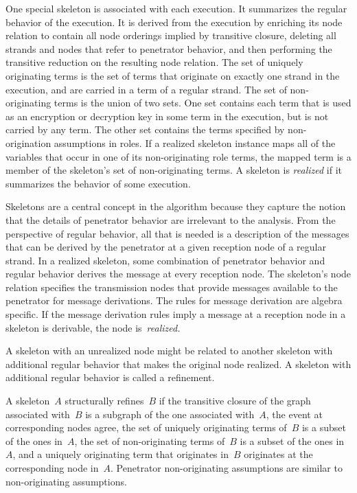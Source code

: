 \documentclass[12pt]{article}
\begin{document}
One special skeleton is associated with each execution.  It summarizes
the regular behavior of the execution.  It is derived from the
execution by enriching its node relation to contain all node orderings
implied by transitive closure, deleting all strands and nodes that
refer to penetrator behavior, and then performing the transitive
reduction on the resulting node relation.  The set of uniquely
originating terms is the set of terms that originate on exactly one
strand in the execution, and are carried in a term of a regular
strand.  The set of non-originating terms is the union of two sets.
One set contains each term that is used as an encryption or decryption
key in some term in the execution, but is not carried by any term.
The other set contains the terms specified by non-origination
assumptions in roles.  If a realized skeleton instance maps all of the
variables that occur in one of its non-originating role terms, the
mapped term is a member of the skeleton's set of non-originating
terms.  A skeleton is \emph{realized} if it
summarizes the behavior of some execution.

Skeletons are a central concept in the {\cpsa} algorithm because they
capture the notion that the details of penetrator behavior are
irrelevant to the analysis.  From the perspective of regular behavior,
all that is needed is a description of the messages that can be
derived by the penetrator at a given reception node of a regular
strand.  In a realized skeleton, some combination of penetrator
behavior and regular behavior derives the message at every reception
node.  The skeleton's node relation specifies the transmission nodes
that provide messages available to the penetrator for message
derivations.  The rules for message derivation are algebra specific.
If the message derivation rules imply a message at a reception node in a
skeleton is derivable, the node is~\emph{realized.}

A skeleton with an unrealized node might be related to another
skeleton with additional regular behavior that makes the original node
realized.  A skeleton with additional regular behavior is called a
refinement.

A skeleton~$A$ structurally refines~$B$ if the transitive closure of the
graph associated with~$B$ is a subgraph of the one associated
with~$A$, the event at corresponding nodes agree, the set of
uniquely originating terms of~$B$ is a subset of the ones in~$A$, the
set of non-originating terms of~$B$ is a subset of the ones in~$A$,
and a uniquely originating term that originates in~$B$ originates at
the corresponding node in~$A$.  Penetrator non-originating assumptions
are similar to non-originating assumptions.
\end{document}
